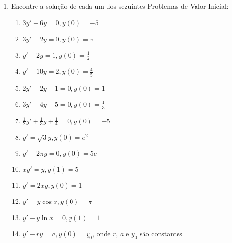 \documentclass[a4paper]{article}
\begin{document}
\begin{enumerate}
\item Encontre a solução de cada um dos seguintes Problemas de Valor
  Inicial:

  \begin{enumerate}
  \item $3y' -6y = 0 , y(0) = -5$
  \item $3y' -2y =0, y(0) = \pi$
  \item $y' - 2y = 1, y(0) = \frac{1}{2}$
  \item $y' - 10y = 2, y(0) = \frac{4}{5}$
  \item $2y' + 2y -1 = 0, y(0) = 1$
  \item $3y'- 4y +5 = 0, y(0) = \frac{1}{3}$
  \item $\frac{1}{2} y' + \frac{1}{3} y + \frac{1}{4} = 0, y(0) = -5$
  \item $y' = \sqrt{3}y, y(0) = e^2$
  \item $y' -2\pi y =0, y(0) = 5e$
  \item $xy' = y, y(1) = 5$
  \item $y' = 2xy, y(0)=1$
  \item $y' = y\cos x, y(0)=\pi$
  \item $y' - y\ln x = 0, y(1)=1$
  \item $y' -ry = a, y(0) = y_0$, onde $r$, $a$ e $y_0$ são constantes
  \end{enumerate}



\end{enumerate}
\end{document}
